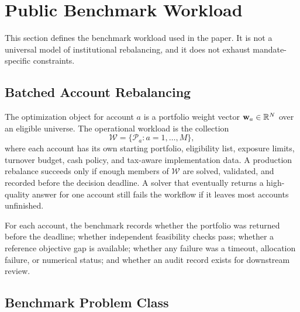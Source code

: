 \documentclass[10pt,a4paper]{extarticle}
\begin{document}
\section{Public Benchmark Workload}
\label{sec:setting}

This section defines the benchmark workload used in the paper. It is not a
universal model of institutional rebalancing, and it does not exhaust
mandate-specific constraints.

\subsection{Batched Account Rebalancing}

The optimization object for account $a$ is a portfolio weight vector
$\mathbf{w}_a \in \mathbb{R}^N$ over an eligible universe. The operational workload is the
collection
\[
  \mathcal{W}=\{ \mathcal{P}_a : a=1,\ldots,M\},
\]
where each account has its own starting portfolio, eligibility list, exposure
limits, turnover budget, cash policy, and tax-aware implementation data. A
production rebalance succeeds only if enough members of $\mathcal{W}$ are
solved, validated, and recorded before the decision deadline. A solver that
eventually returns a high-quality answer for one account still fails the
workflow if it leaves most accounts unfinished.

For each account, the benchmark records whether the portfolio was returned
before the deadline; whether independent feasibility checks pass; whether a
reference objective gap is available; whether any failure was a timeout,
allocation failure, or numerical status; and whether an audit record exists
for downstream review.

\subsection{Benchmark Problem Class}
\end{document}
